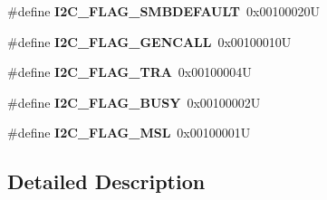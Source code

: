 \begin{DoxyCompactItemize}
\#define {\bfseries I2\+C\+\_\+\+F\+L\+A\+G\+\_\+\+S\+M\+B\+D\+E\+F\+A\+U\+LT}~0x00100020U
\item 
\mbox{\label{group___i2_c___flag__definition_gab3a93b6840ad406c2fc09e0e96c59b88}} 
\#define {\bfseries I2\+C\+\_\+\+F\+L\+A\+G\+\_\+\+G\+E\+N\+C\+A\+LL}~0x00100010U
\item 
\mbox{\label{group___i2_c___flag__definition_ga0359a5f960670d51cb17e659d32498ea}} 
\#define {\bfseries I2\+C\+\_\+\+F\+L\+A\+G\+\_\+\+T\+RA}~0x00100004U
\item 
\mbox{\label{group___i2_c___flag__definition_ga50f69f043d99600221076100823b6ff3}} 
\#define {\bfseries I2\+C\+\_\+\+F\+L\+A\+G\+\_\+\+B\+U\+SY}~0x00100002U
\item 
\mbox{\label{group___i2_c___flag__definition_gae8e6a404cbfd70420d278d520304f368}} 
\#define {\bfseries I2\+C\+\_\+\+F\+L\+A\+G\+\_\+\+M\+SL}~0x00100001U
\end{DoxyCompactItemize}


\subsection{Detailed Description}

